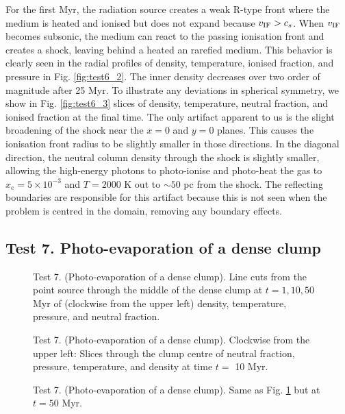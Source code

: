 \documentclass[useAMS,usenatbib]{mn2e}
\begin{document}
For the first Myr, the radiation source creates a weak R-type front
where the medium is heated and ionised but does not expand because
$v_{\rm IF} > c_s$.  When $v_{\rm IF}$ becomes subsonic, the medium
can react to the passing ionisation front and creates a shock, leaving
behind a heated an rarefied medium.  This behavior is clearly seen in
the radial profiles of density, temperature, ionised fraction, and
pressure in Fig. \ref{fig:test6_2}.  The inner density decreases
over two order of magnitude after 25 Myr.  To illustrate any
deviations in spherical symmetry, we show in Fig. \ref{fig:test6_3}
slices of density, temperature, neutral fraction, and ionised fraction
at the final time.  The only artifact apparent to us is the slight
broadening of the shock near the $x=0$ and $y=0$ planes.  This causes
the ionisation front radius to be slightly smaller in those
directions.  In the diagonal direction, the neutral column density
through the shock is slightly smaller, allowing the high-energy
photons to photo-ionise and photo-heat the gas to $x_e = 5 \times
10^{-3}$ and $T = 2000$ K out to $\sim50$ pc from the shock.  The
reflecting boundaries are responsible for this artifact because this
is not seen when the problem is centred in the domain, removing any
boundary effects.

\subsection{Test 7. Photo-evaporation of a dense clump}

\begin{figure}
  \caption{\label{fig:test7_1} Test 7. (Photo-evaporation of a dense
    clump).  Line cuts from the point source through the middle of the
    dense clump at $t = 1, 10, 50$ Myr of (clockwise from the upper
    left) density, temperature, pressure, and neutral fraction.}
\end{figure}

\begin{figure*}
  \caption{\label{fig:test7_2} Test 7. (Photo-evaporation of a dense
    clump).  Clockwise from the upper left: Slices through the clump
    centre of neutral fraction, pressure, temperature, and density at
    time $t =$ 10 Myr.}
\end{figure*}

\begin{figure*}
  \caption{\label{fig:test7_3} Test 7. (Photo-evaporation of a dense
    clump).  Same as Fig. \ref{fig:test7_1} but at $t = 50$ Myr.}
\end{figure*}
\end{document}
